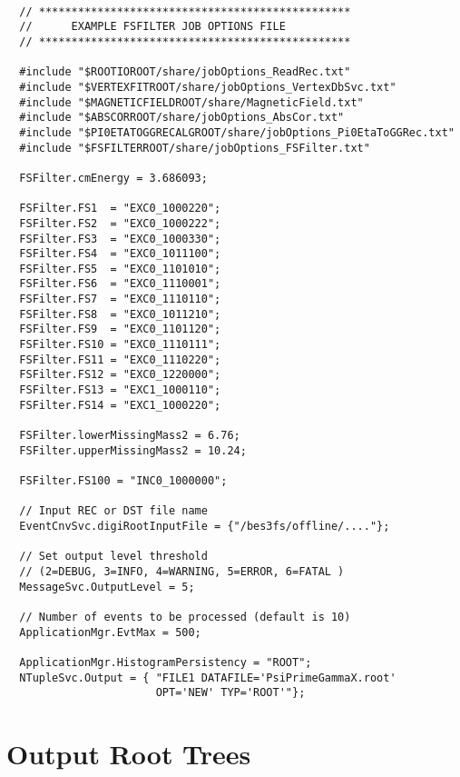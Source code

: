 \documentclass[11pt]{article}
\begin{document}
\begin{verbatim}

  // ************************************************
  //      EXAMPLE FSFILTER JOB OPTIONS FILE
  // ************************************************

  #include "$ROOTIOROOT/share/jobOptions_ReadRec.txt"
  #include "$VERTEXFITROOT/share/jobOptions_VertexDbSvc.txt"
  #include "$MAGNETICFIELDROOT/share/MagneticField.txt"
  #include "$ABSCORROOT/share/jobOptions_AbsCor.txt"
  #include "$PI0ETATOGGRECALGROOT/share/jobOptions_Pi0EtaToGGRec.txt"
  #include "$FSFILTERROOT/share/jobOptions_FSFilter.txt"

  FSFilter.cmEnergy = 3.686093;

  FSFilter.FS1  = "EXC0_1000220";
  FSFilter.FS2  = "EXC0_1000222";
  FSFilter.FS3  = "EXC0_1000330";
  FSFilter.FS4  = "EXC0_1011100";
  FSFilter.FS5  = "EXC0_1101010";
  FSFilter.FS6  = "EXC0_1110001";
  FSFilter.FS7  = "EXC0_1110110";
  FSFilter.FS8  = "EXC0_1011210";
  FSFilter.FS9  = "EXC0_1101120";
  FSFilter.FS10 = "EXC0_1110111";
  FSFilter.FS11 = "EXC0_1110220";
  FSFilter.FS12 = "EXC0_1220000";
  FSFilter.FS13 = "EXC1_1000110";
  FSFilter.FS14 = "EXC1_1000220";

  FSFilter.lowerMissingMass2 = 6.76;
  FSFilter.upperMissingMass2 = 10.24;

  FSFilter.FS100 = "INC0_1000000";

  // Input REC or DST file name 
  EventCnvSvc.digiRootInputFile = {"/bes3fs/offline/...."};

  // Set output level threshold 
  // (2=DEBUG, 3=INFO, 4=WARNING, 5=ERROR, 6=FATAL )
  MessageSvc.OutputLevel = 5;

  // Number of events to be processed (default is 10)
  ApplicationMgr.EvtMax = 500;

  ApplicationMgr.HistogramPersistency = "ROOT";
  NTupleSvc.Output = { "FILE1 DATAFILE='PsiPrimeGammaX.root' 
                       OPT='NEW' TYP='ROOT'"};
\end{verbatim}


\section{Output Root Trees}
\label{sec:tree}
\end{document}
